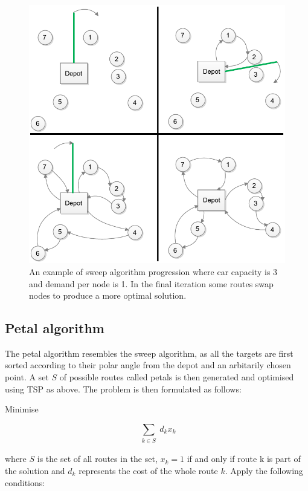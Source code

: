 \begin{figure}[h]
  \begin{center}
    \includegraphics{images/Sweep1.pdf}
    \caption{An example of sweep algorithm progression where car capacity is 3 and demand per node is 1. In the final iteration some routes swap nodes to produce a more optimal solution.}
    \label{fig:sweep1}
  \end{center}
\end{figure}

\subsection{Petal algorithm}

The petal algorithm resembles the sweep algorithm, as all the targets are first sorted according to their polar angle from the depot and an arbitarily chosen point. A set $S$ of possible routes called petals is then generated and optimised using TSP as above. The problem is then formulated as follows:

\bigskip
\noindent
Minimise

\begin{equation}
\label{eq:petal1}
\displaystyle\sum_{\substack{k \in S}} d_kx_k
\end{equation}


\noindent
where $S$ is the set of all routes in the set, $x_k = 1$ if and only if route k is part of the solution and $d_k$ represents the cost of the whole route $k$. Apply the following conditions:


